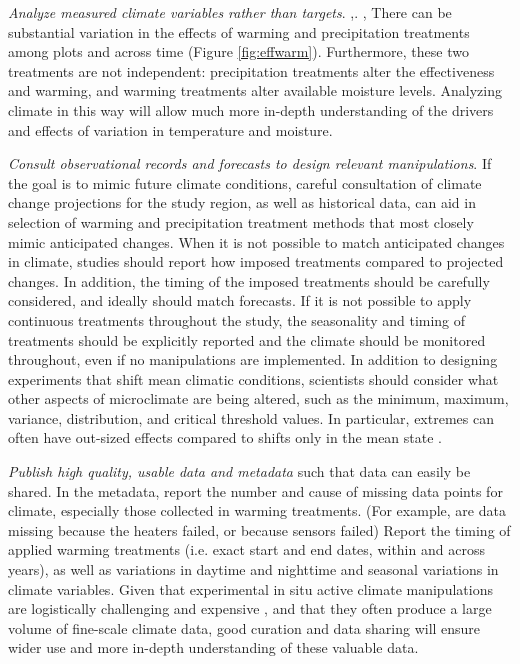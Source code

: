 \documentclass{article}
\begin{document}
\par\textit{Analyze measured climate variables rather than targets}. ,. , There can be substantial variation in the effects of warming and precipitation treatments among plots and across time  (Figure \ref{fig:effwarm}). Furthermore, these two treatments are not independent: precipitation treatments alter the effectiveness and warming, and warming treatments alter available moisture levels. Analyzing climate in this way will allow much more in-depth understanding of the drivers and effects of variation in temperature and moisture.%
\par\textit{Consult observational records and forecasts to design relevant manipulations}. If the goal is to mimic future climate conditions, careful consultation of climate change projections for the study region, as well as historical data, can aid in selection of warming and precipitation treatment methods that most closely mimic anticipated changes. When it is not possible to match anticipated changes in climate, studies should report how imposed treatments compared to projected changes. In addition, the timing of the imposed treatments should be carefully considered, and ideally should match forecasts. If it is not possible to apply continuous treatments throughout the study, the seasonality and timing of treatments should be explicitly reported and the climate should be monitored throughout, even if no manipulations are implemented. In addition to designing experiments that shift mean climatic conditions, scientists should consider what other aspects of microclimate are being altered, such as the minimum, maximum, variance, distribution, and critical threshold values. In particular, extremes can often have out-sized effects compared to shifts only in the mean state \citep{vasseur2014}.
\par\textit{Publish high quality, usable data and metadata} such that data can easily be shared. In the metadata, report the number and cause of missing data points for climate, especially those collected in warming treatments. (For example, are data missing because the heaters failed, or because sensors failed) Report the timing of applied warming treatments (i.e. exact start and end dates, within and across years), as well as variations in daytime and nighttime and seasonal variations in climate variables. Given that experimental in situ active climate  manipulations are logistically challenging  and expensive \citep{aronson2009}, and that they often produce a large volume of fine-scale climate data, good curation and data sharing will ensure wider use and more in-depth understanding of these valuable data. 
\end{document}

